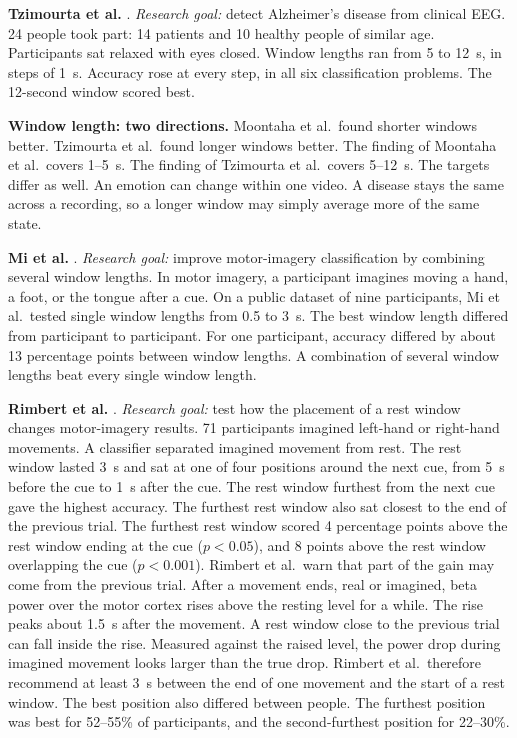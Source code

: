 \documentclass[12pt,a4paper]{report}
\begin{document}
\textbf{Tzimourta et al.} \cite{tzimourta_eeg_2019}. \emph{Research goal:} detect Alzheimer's disease from clinical EEG. 24 people took part: 14 patients and 10 healthy people of similar age. Participants sat relaxed with eyes closed. Window lengths ran from 5 to 12~s, in steps of 1~s. Accuracy rose at every step, in all six classification problems. The 12-second window scored best.

\textbf{Window length: two directions.} Moontaha et al.\ found shorter windows better. Tzimourta et al.\ found longer windows better. The finding of Moontaha et al.\ covers 1--5~s. The finding of Tzimourta et al.\ covers 5--12~s. The targets differ as well. An emotion can change within one video. A disease stays the same across a recording, so a longer window may simply average more of the same state.

\textbf{Mi et al.} \cite{mi_exploring_2026}. \emph{Research goal:} improve motor-imagery classification by combining several window lengths. In motor imagery, a participant imagines moving a hand, a foot, or the tongue after a cue. On a public dataset of nine participants, Mi et al.\ tested single window lengths from 0.5 to 3~s. The best window length differed from participant to participant. For one participant, accuracy differed by about 13 percentage points between window lengths. A combination of several window lengths beat every single window length.

\textbf{Rimbert et al.} \cite{rimbert_impact_2023}. \emph{Research goal:} test how the placement of a rest window changes motor-imagery results. 71 participants imagined left-hand or right-hand movements. A classifier separated imagined movement from rest. The rest window lasted 3~s and sat at one of four positions around the next cue, from 5~s before the cue to 1~s after the cue. The rest window furthest from the next cue gave the highest accuracy. The furthest rest window also sat closest to the end of the previous trial. The furthest rest window scored 4 percentage points above the rest window ending at the cue ($p<0.05$), and 8 points above the rest window overlapping the cue ($p<0.001$). Rimbert et al.\ warn that part of the gain may come from the previous trial. After a movement ends, real or imagined, beta power over the motor cortex rises above the resting level for a while. The rise peaks about 1.5~s after the movement. A rest window close to the previous trial can fall inside the rise. Measured against the raised level, the power drop during imagined movement looks larger than the true drop. Rimbert et al.\ therefore recommend at least 3~s between the end of one movement and the start of a rest window. The best position also differed between people. The furthest position was best for 52--55\% of participants, and the second-furthest position for 22--30\%.
\end{document}
